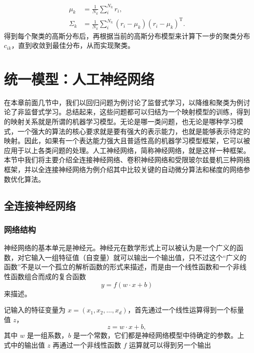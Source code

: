 \begin{equation}
\begin{aligned}
\mu_k&=\frac{1}{N_k}\sum_i^{N_k}r_i,\\
\Sigma_k&=\frac{1}{N_k}\sum_i^{N_k}(r_i-\mu_k)(r_i-\mu_k)^{\mathrm T}.
\end{aligned}
\tag{8.2.15}
\end{equation}
得到每个聚类的高斯分布后，再根据当前的高斯分布模型来计算下一步的聚类分布 $c_{ik}$，直到收敛到最佳分布，从而实现聚类。

\section{统一模型：人工神经网络}
在本章前面几节中，我们以回归问题为例讨论了监督式学习，以降维和聚类为例讨论了非监督式学习。总结起来，这些问题都可以归结为一个映射模型的训练，得到的映射关系就是所谓的机器学习模型。无论是哪一类问题，也无论是哪种学习模式，一个强大的算法的核心要求就是要有强大的表示能力，也就是能够表示待定的映射。因此，如果有一个表达能力强大且普适性高的机器学习模型框架，它可以被应用于以上各类问题的处理。人工神经网络，简称神经网络，就是这样一种框架。本节中我们将主要介绍全连接神经网络、卷积神经网络和受限玻尔兹曼机三种网络框架，并以全连接神经网络为例介绍其中比较关键的自动微分算法和梯度的网络参数优化算法。

\subsection{全连接神经网络}
\subsubsection{网络结构}
神经网络的基本单元是神经元。神经元在数学形式上可以被认为是一个广义的函数，对它输入一组特征值（自变量）就可以输出一个输出值，只不过这个“广义的函数”不是以一个孤立的解析函数的形式来描述，而是由一个线性函数和一个非线性函数组合而成的复合函数
\begin{equation}
y=f(w\cdot x+b)
\tag{8.3.1}
\end{equation}
来描述。

记输入的特征变量为 $x=(x_1,x_2,\ldots,x_d)$，首先通过一个线性运算得到一个标量值 $z$，
\begin{equation}
z=w\cdot x+b,
\tag{8.3.2}
\end{equation}
其中 $w$ 是一组系数，$b$ 是一个常数，它们都是神经网络模型中待确定的参数。上式中的输出值 $z$ 再通过一个非线性函数 $f$ 运算就可以得到另一个输出

